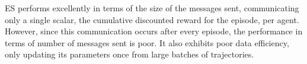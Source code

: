 ES performs excellently in terms of the size of the messages sent, communicating only a single scalar, the cumulative discounted reward for the episode, per agent. However, since this communication occurs after every episode, the performance in terms of number of messages sent is poor. It also exhibits poor data efficiency, only updating its parameters once from large batches of trajectories.




